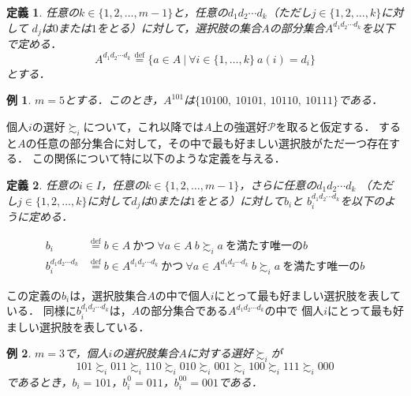 \documentclass[dvipdfmx]{jsarticle}
\newtheorem{definition}{定義}[section]
\newtheorem{example}{例}[section]
\begin{document}
\begin{definition}
  任意の$k \in \{1,2,\ldots,m-1\}$と，任意の$d_{1}d_{2}\cdots d_{k}$（ただし$j \in \{1,2,\ldots,k\}$に対して
  $d_j$は$0$または$1$をとる）に対して，選択肢の集合$A$の部分集合$A^{d_{1}d_{2}\cdots d_{k}}$を以下で定める．
  \[
    A^{d_{1}d_{2}\cdots d_{k}} \stackrel{\mathrm{def}}{=} \{a \in A\ |\ 
      \forall i \in \{1,\ldots,k\} \ a(i) = d_i \}
  \]
  とする．
\end{definition}


\begin{example}
  $m=5$とする．このとき，$A^{101}$は$\{10100,\ 10101,\ 10110,\ 10111\}$である．
\end{example}

個人$i$の選好$\succsim_i$について，これ以降では$A$上の強選好$\mathcal{P}$を取ると仮定する．
すると$A$の任意の部分集合に対して，その中で最も好ましい選択肢がただ一つ存在する．
この関係について特に以下のような定義を与える．

\begin{definition}\label{def:最上位選択肢}
  任意の$i \in I$，任意の$k \in \{1,2,\ldots,m-1\}$，さらに任意の$d_{1}d_{2}\cdots d_{k}$
  （ただし$j \in \{1,2,\ldots,k \}$に対して$d_j$は$0$または$1$をとる）に対して$b_{i}$と
  $b_{i}^{d_{1}d_{2}\cdots d_{k}}$を以下のように定める．

  \begin{align*}
    b_i &\stackrel{\mathrm{def}}{=} b \in A\ \text{かつ}\ \forall a \in A \ b \succsim_i a\
    \text{を満たす唯一の}b \\
    b_{i}^{d_{1}d_{2}\cdots d_{k}} &\stackrel{\mathrm{def}}{=}
    b \in A^{d_{1}d_{2}\cdots d_{k}} \ \text{かつ}\ \forall a \in A^{d_{1}d_{2}\cdots d_{k}}
    \ b \succsim_i a\ \text{を満たす唯一の}b
  \end{align*}
\end{definition}

\noindent{}この定義の$b_i$は，選択肢集合$A$の中で個人$i$にとって最も好ましい選択肢を表している．
同様に$b_{i}^{d_{1}d_{2}\cdots d_{k}}$は，$A$の部分集合である$A^{d_{1}d_{2}\cdots d_{k}}$の中で
個人$i$にとって最も好ましい選択肢を表している．

\begin{example}
  $m=3$で，個人$i$の選択肢集合$A$に対する選好$\succsim_i$が
  \[
    101 \succsim_i 011 \succsim_i 110 \succsim_i 010 \succsim_i 001 \succsim_i 100
    \succsim_i 111 \succsim_i 000
  \]
  であるとき，$b_i = 101$，$b_{i}^{0} = 011$，$b_{i}^{00} = 001$である．
\end{example}
\end{document}
